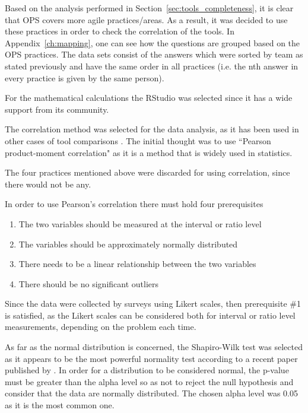 Based on the analysis performed in Section~\ref{sec:tools_completeness}, it is clear that \ac{OPS} covers more agile practices/areas. As a result, it was decided to use these practices in order to check the correlation of the tools. In Appendix~\ref{ch:mapping}, one can see how the questions are grouped based on the \ac{OPS} practices. The data sets consist of the answers which were sorted by team as stated previously and have the same order in all practices (i.e. the nth answer in every practice is given by the same person).

For the mathematical calculations the RStudio \texttrademark \cite{rstudio} was selected since it has a wide support from its community. 

The correlation method was selected for the data analysis, as it has been used in other cases of tool comparisons \cite{jalali_angelis} \cite{Delestras2013}. The initial thought was to use ``Pearson product-moment correlation" as it is a method that is widely used in statistics. 

The four practices mentioned above were discarded for using correlation, since there would not be any.

In order to use Pearson’s correlation there must hold four prerequisites
\begin{enumerate}
\item The two variables should be measured at the interval or ratio level
\item The variables should be approximately normally distributed
\item There needs to be a linear relationship between the two variables
\item There should be no significant outliers
\end{enumerate}

Since the data were collected by surveys using Likert scales, then prerequisite \#1 is satisfied, as the Likert scales can be considered both for interval or ratio level measurements, depending on the problem each time.

As far as the normal distribution is concerned, the Shapiro-Wilk test was selected as it appears to be the most powerful normality test according to a recent paper published by \citet{Razali}. In order for a distribution to be considered normal, the p-value must be greater than the alpha level so as not to reject the null hypothesis and consider that the data are normally distributed. The chosen alpha level was 0.05 as it is the most common one.

